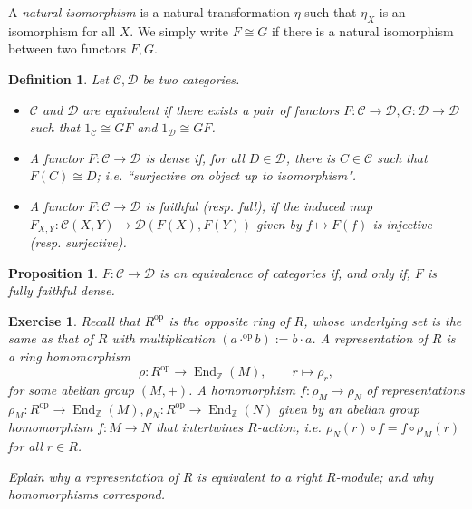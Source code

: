 \documentclass[11pt,a4paper]{article}
\numberwithin{equation}{section}
\theoremstyle{all}
\newtheorem{proposition}[theorem]{Proposition}
\newtheorem{definition}[theorem]{Definition}
\newtheorem{exercise}[theorem]{Exercise}
\theoremstyle{remark}
\newcommand{\Z}{\mathbb{Z}}
\newcommand{\CC}{\mathcal{C}}
\newcommand{\CD}{\mathcal{D}}
\newcommand{\End}{\operatorname{End}\nolimits}
\newcommand{\op}{\mathrm{op}}
\newcommand{\defn}[1]{\textsl{\color{darkblue} #1}}
\begin{document}
A \defn{natural isomorphism} is a natural transformation $\eta$ such that $\eta_X$ is an isomorphism for all $X$.  We simply write $F\cong G$ if there is a natural isomorphism between two functors $F,G$.

\begin{definition}
Let $\CC,\CD$ be two categories.
\begin{itemize}
\item $\CC$ and $\CD$ are \defn{equivalent} if there exists a pair of functors $F:\CC\to\CD, G:\CD\to\CD$ such that $1_\CC\cong GF$ and $1_{\CD}\cong GF$.

\item A functor $F:\CC\to\CD$ is \defn{dense} if, for all $D\in\CD$, there is $C\in\CC$ such that $F(C)\cong D$; i.e. ``surjective on object up to isomorphism".

\item A functor $F:\CC\to\CD$ is \defn{faithful} (resp. \defn{full}), if the induced map $F_{X,Y}:\CC(X,Y)\to \CD(F(X),F(Y))$ given by $f\mapsto F(f)$ is injective (resp. surjective).
\end{itemize}
\end{definition}

\begin{proposition}
$F:\CC\to\CD$ is an equivalence of categories if, and only if, $F$ is fully faithful dense.
\end{proposition}


\begin{exercise}
Recall that $R^\op$ is the opposite ring of $R$, whose underlying set is the same as that of $R$ with multiplication $(a\cdot^{\op}b):=b\cdot a$.
A \defn{representation} of $R$ is a ring homomorphism
\[
\rho: R^\op \to \End_\Z(M), \qquad  r \mapsto \rho_r,
\]
for some abelian group $(M,+)$.
A homomorphism $f:\rho_M\to \rho_N$ of representations $\rho_M:R^\op \to \End_\Z(M), \rho_N:R^\op \to \End_\Z(N)$ given by an abelian group homomorphism $f:M\to N$ that intertwines $R$-action, i.e. $\rho_N(r)\circ f=f\circ \rho_M(r)$ for all $r\in R$.

Eplain why a representation of $R$ is equivalent to a right $R$-module; and why homomorphisms correspond.
\end{exercise}

\end{document}

